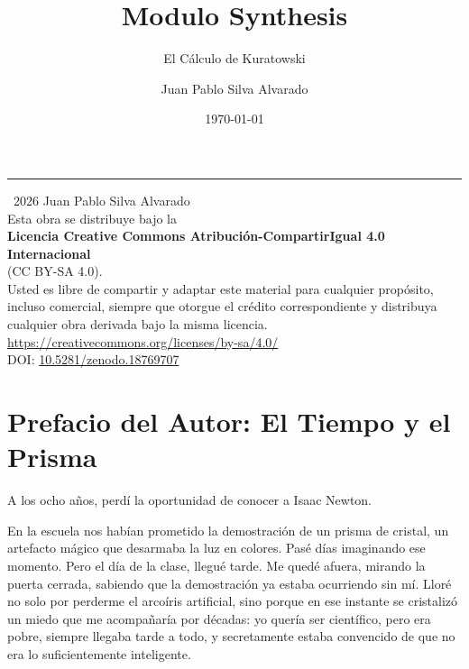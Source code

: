 \documentclass[11pt, a4paper, openany]{book}
\title{Modulo Synthesis}
\subtitle{El C\'alculo de Kuratowski}
\author{Juan Pablo Silva Alvarado}
\date{\today}
\makeatletter
\gdef\@subtitle{}\gdef\@extrainfo{}
\renewcommand{\maketitle}{%
  \begin{titlepage}\centering
    \vspace*{4cm}
    {\Huge\bfseries\color{structure}\@title\par}\vspace{0.6cm}
    \ifx\@subtitle\empty\else{\Large\color{gray!80}\@subtitle\par}\fi
    \vspace{2cm}
    {\color{main}\rule{0.6\textwidth}{2pt}\par}\vspace{2cm}
    {\LARGE\@author\par}\vspace{1cm}
    {\large\@date\par}\vfill
    \ifx\@extrainfo\empty\else
      \begin{minipage}{0.8\textwidth}\centering\itshape\color{gray!60}\@extrainfo\end{minipage}\vspace{3cm}
    \fi
  \end{titlepage}
}
\makeatother
\begin{document}
\maketitle

\thispagestyle{empty}
\vspace*{\fill}
\begin{center}
\textcopyright\ 2026 Juan Pablo Silva Alvarado\\[1em]
Esta obra se distribuye bajo la\\[4pt]
{\bfseries Licencia Creative Commons Atribuci\'on-CompartirIgual 4.0 Internacional}\\[4pt]
(CC BY-SA 4.0).\\[1em]
Usted es libre de compartir y adaptar este material para cualquier prop\'osito,\\
incluso comercial, siempre que otorgue el cr\'edito correspondiente y distribuya\\
cualquier obra derivada bajo la misma licencia.\\[1em]
\url{https://creativecommons.org/licenses/by-sa/4.0/}\\[2em]
{\small DOI: \href{https://doi.org/10.5281/zenodo.18769707}{10.5281/zenodo.18769707}}
\end{center}
\vspace*{\fill}
\clearpage

\frontmatter
\tableofcontents
\mainmatter


\chapter*{Prefacio del Autor: El Tiempo y el Prisma}

A los ocho a\~nos, perd\'i la oportunidad de conocer a Isaac Newton.

En la escuela nos hab\'ian prometido la demostraci\'on de un prisma de
cristal, un artefacto m\'agico que desarmaba la luz en colores. Pas\'e
d\'ias imaginando ese momento. Pero el d\'ia de la clase, llegu\'e
tarde. Me qued\'e afuera, mirando la puerta cerrada, sabiendo que la
demostraci\'on ya estaba ocurriendo sin m\'i. Llor\'e no solo por
perderme el arco\'iris artificial, sino porque en ese instante se
cristaliz\'o un miedo que me acompa\~nar\'ia por d\'ecadas: yo quer\'ia
ser cient\'ifico, pero era pobre, siempre llegaba tarde a todo, y
secretamente estaba convencido de que no era lo suficientemente
inteligente.
\end{document}
